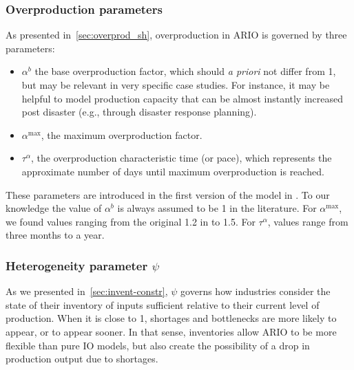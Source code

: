 \documentclass[main.tex]{subfiles}
\begin{document}

\subsubsection{Overproduction parameters}
\label{sec:overprod-params}

As presented in~\cref{sec:overprod_sh}, overproduction in ARIO is
governed by three parameters:
\begin{itemize}
\item $\alpha^{b}$ the base overproduction factor, which should \emph{a priori}
  not differ from 1, but may be relevant in very specific case studies. For
  instance, it may be helpful to model production capacity that can be almost
  instantly increased post disaster (e.g., through disaster response planning).
\item $\alpha^{\textrm{max}}$, the maximum overproduction factor.
\item $\tau^{\alpha}$, the overproduction characteristic time (or pace), which
  represents the approximate number of days until maximum overproduction is
  reached.
\end{itemize}

These parameters are introduced in the first version of the model in
\textcite{hallegatte-2008-adapt-region}. To our knowledge the value
of $\alpha^{b}$ is always assumed to be 1 in the literature. For
$\alpha^{\textrm{max}}$, we found values ranging from the original 1.2 in
\textcite{hallegatte-2008-adapt-region} to 1.5. For $\tau^{\alpha}$,
values range from three months to a year.

\subsubsection{Heterogeneity parameter $\psi$}
\label{sec:parameter-psi}

As we presented in~\cref{sec:invent-constr}, $\psi$ governs how
industries consider the state of their inventory of inputs sufficient relative
to their current level of production. When it is close to 1, shortages and
bottlenecks are more likely to appear, or to appear sooner. In that sense,
inventories allow ARIO to be more flexible than pure IO models, but also create
the possibility of a drop in production output due to shortages.
\end{document}
